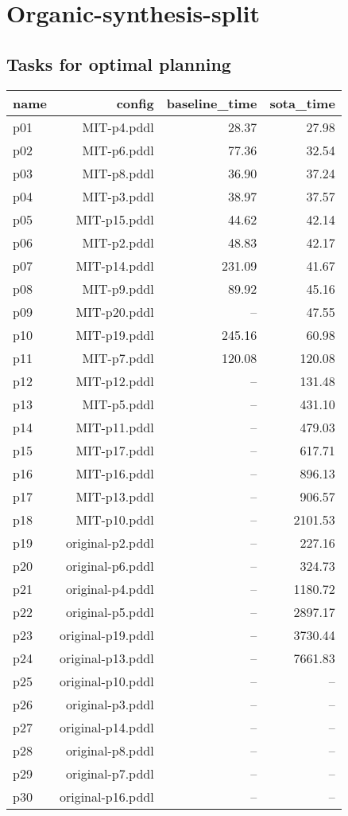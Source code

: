 \documentclass{article}
\begin{document}
                \newpage \section{Organic-synthesis-split}
                    \subsection*{Tasks for optimal planning}
                    
                            \begin{center}
                            \scriptsize
                            \begin{tabular}{@{}l|r|r|r@{}}
                            name & config & baseline\_time & sota\_time\\\midrule
                              p01& MIT-p4.pddl&28.37&27.98\\
  p02& MIT-p6.pddl&77.36&32.54\\
  p03& MIT-p8.pddl&36.90&37.24\\
  p04& MIT-p3.pddl&38.97&37.57\\
  p05& MIT-p15.pddl&44.62&42.14\\
  p06& MIT-p2.pddl&48.83&42.17\\
  p07& MIT-p14.pddl&231.09&41.67\\
  p08& MIT-p9.pddl&89.92&45.16\\
  p09& MIT-p20.pddl&--&47.55\\
  p10& MIT-p19.pddl&245.16&60.98\\
  p11& MIT-p7.pddl&120.08&120.08\\
  p12& MIT-p12.pddl&--&131.48\\
  p13& MIT-p5.pddl&--&431.10\\
  p14& MIT-p11.pddl&--&479.03\\
  p15& MIT-p17.pddl&--&617.71\\
  p16& MIT-p16.pddl&--&896.13\\
  p17& MIT-p13.pddl&--&906.57\\
  p18& MIT-p10.pddl&--&2101.53\\
  p19& original-p2.pddl&--&227.16\\
  p20& original-p6.pddl&--&324.73\\
  p21& original-p4.pddl&--&1180.72\\
  p22& original-p5.pddl&--&2897.17\\
  p23& original-p19.pddl&--&3730.44\\
  p24& original-p13.pddl&--&7661.83\\
  p25& original-p10.pddl&--&--\\
  p26& original-p3.pddl&--&--\\
  p27& original-p14.pddl&--&--\\
  p28& original-p8.pddl&--&--\\
  p29& original-p7.pddl&--&--\\
  p30& original-p16.pddl&--&--
                            \end{tabular}
                            \end{center}
                    
\end{document}
